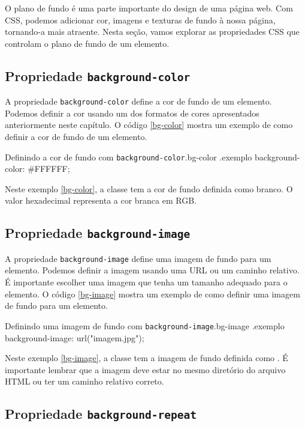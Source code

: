 O plano de fundo é uma parte importante do design de uma página web. Com CSS, podemos adicionar cor, imagens e texturas de fundo à nossa página, tornando-a mais atraente. Nesta seção, vamos explorar as propriedades CSS que controlam o plano de fundo de um elemento.

\subsection{Propriedade \texttt{background-color}}

A propriedade \texttt{background-color} define a cor de fundo de um elemento. Podemos definir a cor usando um dos formatos de cores apresentados anteriormente neste capítulo. O código \ref{bg-color} mostra um exemplo de como definir a cor de fundo de um elemento.

\begin{csscode}{Definindo a cor de fundo com \texttt{background-color}.}{bg-color}
.exemplo {
    background-color: #FFFFFF;
}
\end{csscode}

Neste exemplo \ref{bg-color}, a classe  tem a cor de fundo definida como branco. O valor hexadecimal  representa a cor branca em RGB.

\subsection{Propriedade \texttt{background-image}}

A propriedade \texttt{background-image} define uma imagem de fundo para um elemento. Podemos definir a imagem usando uma URL ou um caminho relativo. É importante escolher uma imagem que tenha um tamanho adequado para o elemento. O código \ref{bg-image} mostra um exemplo de como definir uma imagem de fundo para um elemento.

\begin{csscode}{Definindo uma imagem de fundo com \texttt{background-image}.}{bg-image}
.exemplo {
    background-image: url("imagem.jpg");
}
\end{csscode}

Neste exemplo \ref{bg-image}, a classe  tem a imagem de fundo definida como . É importante lembrar que a imagem deve estar no mesmo diretório do arquivo HTML ou ter um caminho relativo correto.

\subsection{Propriedade \texttt{background-repeat}}

